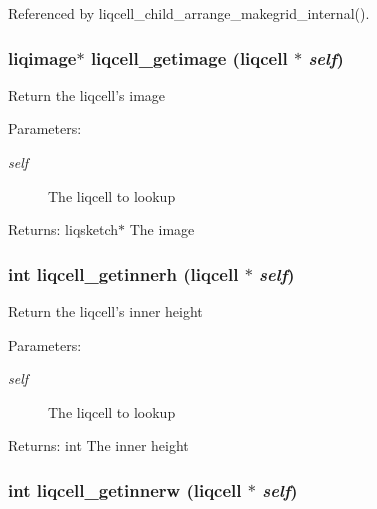 Referenced by liqcell\_\-child\_\-arrange\_\-makegrid\_\-internal().
\subsubsection[{liqcell\_\-getimage}]{\setlength{\rightskip}{0pt plus 5cm}liqimage$\ast$ liqcell\_\-getimage (liqcell $\ast$ {\em self})}\label{d5/da2/liqcell_8c_dd146d20bdff3af5df7f9007caedad13}


Return the liqcell's image \begin{Desc}
\item[Parameters:]
\begin{description}
\item[{\em self}]The liqcell to lookup \end{description}
\end{Desc}
\begin{Desc}
\item[Returns:]liqsketch$\ast$ The image \end{Desc}
\subsubsection[{liqcell\_\-getinnerh}]{\setlength{\rightskip}{0pt plus 5cm}int liqcell\_\-getinnerh (liqcell $\ast$ {\em self})}\label{d5/da2/liqcell_8c_43b42b6e72cfef3481ffcdb65ecfe4fe}


Return the liqcell's inner height \begin{Desc}
\item[Parameters:]
\begin{description}
\item[{\em self}]The liqcell to lookup \end{description}
\end{Desc}
\begin{Desc}
\item[Returns:]int The inner height \end{Desc}
\subsubsection[{liqcell\_\-getinnerw}]{\setlength{\rightskip}{0pt plus 5cm}int liqcell\_\-getinnerw (liqcell $\ast$ {\em self})}\label{d5/da2/liqcell_8c_0a196fdaeddee362fb4a8c7c5a173bf2}


